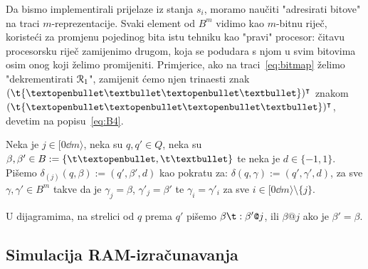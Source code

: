 
Da bismo implementirali prijelaze iz stanja $s_i$, moramo naučiti "adresirati bitove" na traci $m$-reprezentacije. Svaki element od $B^m$ vidimo kao $m$-bitnu riječ, koristeći za promjenu pojedinog bita istu tehniku kao "pravi" procesor: čitavu procesorsku riječ zamijenimo drugom, koja se podudara s njom u svim bitovima osim onog koji želimo promijeniti. Primjerice, ako na traci~\eqref{eq:bitmap} želimo "dekrementirati $\mathcal R_{1}$", zamijenit ćemo njen trinaesti znak $(\t{\textopenbullet\textbullet\textopenbullet\textbullet})^\intercal$ znakom $(\t{\textopenbullet\textopenbullet\textopenbullet\textbullet})^\intercal$, devetim na popisu~\eqref{eq:B4}.

\begin{definicija}[{name=[funkcija prijelaza u određenom tragu]}]\label{def:trag}
Neka je $j\in[0\dd m\rangle$, neka su $q,q'\in Q$, neka su $\beta,\beta'\in B:=\{\t\textopenbullet,\t\textbullet\}$ te neka je $d\in\{-1,1\}$. Pišemo $\delta_{(j)}(q,\beta):=(q',\beta',d)$ kao pokratu za:
$\delta(q,\gamma):=(q',\gamma',d)$\text,
za sve $\gamma,\gamma'\in B^m$ takve da je $\gamma_j=\beta$, $\gamma'_j=\beta'$ te $\gamma_i=\gamma'_i$ za sve $i\in[0\dd m\rangle\setminus\{j\}$.

U dijagramima, na strelici od $q$ prema $q'$ pišemo $\beta\t:\beta'\texttt@j$, ili $\beta\texttt@j$ ako je $\beta'=\beta$.
\end{definicija}


\subsection{Simulacija RAM-izračunavanja}

